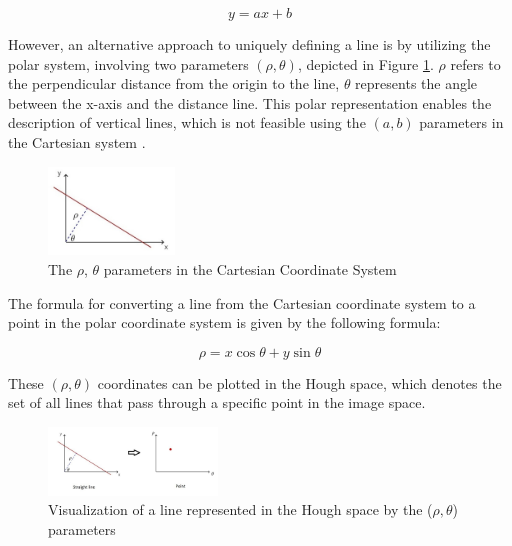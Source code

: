 \documentclass[conference]{IEEEtran}
\begin{document}
\begin{equation}
    y = ax + b
    \label{eq:line}
\end{equation}

However, an alternative approach to uniquely defining a line is by utilizing the polar system, involving two parameters $(\rho, \theta)$, depicted in Figure \ref{fig:Picture18}. $\rho$ refers to the perpendicular distance from the origin to the line, $\theta$ represents the angle between the x-axis and the distance line. This polar representation enables the description of vertical lines, which is not feasible using the $(a,b)$ parameters in the Cartesian system \cite{b15}.

\begin{figure}[h]
    \centering
    \includegraphics[width=0.3\textwidth]{images/Picture18.png}
    \caption{The $\rho$, $\theta$ parameters in the Cartesian Coordinate System \cite{b15}}
    \label{fig:Picture18}
    
\end{figure}

The formula for converting a line from the Cartesian coordinate system to a point in the polar coordinate system is given by the following formula:

\begin{equation}
    \rho = x \cos\theta + y \sin\theta
    \label{eq:polar}
\end{equation}

These $(\rho, \theta)$ coordinates can be plotted in the Hough space, which denotes the set of all lines that pass through a specific point in the image space.

\begin{figure}[h]
    \centering
    \includegraphics[width=0.4\textwidth]{images/Picture19.png}
    \caption{Visualization  of a line represented in the Hough space by the ($\rho, \theta$) parameters \cite{b15}}
    \label{fig:Picture19}
    
\end{figure}
\end{document}
